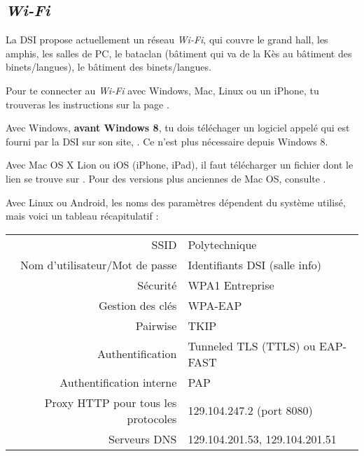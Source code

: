 \subsection{\emph{Wi-Fi}}
La DSI propose actuellement un r\'eseau \emph{Wi-Fi}, qui couvre le grand hall, les amphis, les salles de PC, le bataclan (b\^atiment qui va de la K\`es au b\^atiment des
binets/langues), le b\^atiment des binets/langues.

Pour te connecter au \emph{Wi-Fi} avec Windows, Mac, Linux ou un iPhone, tu trouveras les instructions sur la page .

Avec Windows, \textbf{avant Windows 8}, tu dois t\'el\'echager un logiciel appel\'e  qui est fourni par la DSI sur son site, . Ce n'est plus nécessaire depuis Windows 8.

Avec Mac OS X Lion ou iOS (iPhone, iPad), il faut t\'el\'echarger un fichier 
\newline {} dont le lien se trouve sur . Pour des versions plus anciennes de Mac OS, consulte .

Avec Linux ou Android, les noms des param\`etres d\'ependent du syst\`eme utilis\'e, mais voici un tableau r\'ecapitulatif :
\begin{center}
\begin{tabular}{r|l}
 SSID & Polytechnique \\
 Nom d'utilisateur/Mot de passe & Identifiants DSI (salle info) \\
 S\'ecurit\'e & WPA1 Entreprise \\
 Gestion des cl\'es & WPA-EAP \\
 Pairwise & TKIP \\
 Authentification & Tunneled TLS (TTLS) ou EAP-FAST \\
 Authentification interne & PAP \\
 Proxy HTTP pour tous les protocoles & 129.104.247.2 (port 8080) \\
 Serveurs DNS & 129.104.201.53, 129.104.201.51
\end{tabular}
\end{center}






